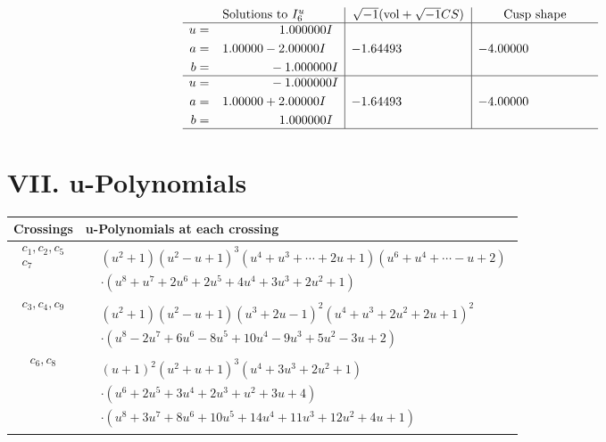 \documentclass[1p]{elsarticle_modified}
\theoremstyle{definition}
\newcommand{\I}{\sqrt{-1}}
\begin{document}
$$\begin{array}{c|c|c}  
\text{Solutions to }I^u_{6}& \I (\text{vol} + \sqrt{-1}CS) & \text{Cusp shape}\\
 \hline 
\begin{aligned}
u &= \phantom{-0.000000 -}1.000000 I \\
a &= \phantom{-}1.00000 - 2.00000 I \\
b &= \phantom{-0.000000 } -1.000000 I\end{aligned}
 & -1.64493\phantom{ +0.000000I} & -4.00000\phantom{ +0.000000I} \\ \hline\begin{aligned}
u &= \phantom{-0.000000 } -1.000000 I \\
a &= \phantom{-}1.00000 + 2.00000 I \\
b &= \phantom{-0.000000 -}1.000000 I\end{aligned}
 & -1.64493\phantom{ +0.000000I} & -4.00000\phantom{ +0.000000I}\\
 \hline 
 \end{array}$$\newpage
\newpage\renewcommand{\arraystretch}{1}
\centering \section*{ VII. u-Polynomials}
\begin{tabular}{m{50pt}|m{274pt}}
Crossings & \hspace{64pt}u-Polynomials at each crossing \\
\hline $$\begin{aligned}c_{1},c_{2},c_{5}\\c_{7}\end{aligned}$$&$\begin{aligned}
&(u^2+1)(u^2- u+1)^3(u^4+u^3+\cdots+2 u+1)(u^6+u^4+\cdots- u+2)\\
&\cdot(u^8+u^7+2 u^6+2 u^5+4 u^4+3 u^3+2 u^2+1)
\end{aligned}$\\
\hline $$\begin{aligned}c_{3},c_{4},c_{9}\end{aligned}$$&$\begin{aligned}
&(u^2+1)(u^2- u+1)(u^3+2 u-1)^2(u^4+u^3+2 u^2+2 u+1)^2\\
&\cdot(u^8-2 u^7+6 u^6-8 u^5+10 u^4-9 u^3+5 u^2-3 u+2)
\end{aligned}$\\
\hline $$\begin{aligned}c_{6},c_{8}\end{aligned}$$&$\begin{aligned}
&(u+1)^2(u^2+u+1)^3(u^4+3 u^3+2 u^2+1)\\
&\cdot(u^6+2 u^5+3 u^4+2 u^3+u^2+3 u+4)\\
&\cdot(u^8+3 u^7+8 u^6+10 u^5+14 u^4+11 u^3+12 u^2+4 u+1)
\end{aligned}$\\
\hline
\end{tabular}\newpage\renewcommand{\arraystretch}{1}
\end{document}
